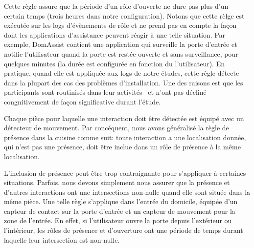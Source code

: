 Cette règle assure que la période d'un rôle d'ouverte ne dure pas plus d'un certain temps (trois heures dans notre configuration). Notons que cette rèlge est exécutée sur les logs d'évènements de rôle et ne prend pas en compte la façon dont les applications d'assistance peuvent réagir à une telle situation. Par exemple, DomAssist contient une application qui surveille la porte d'entrée et notifie l'utilisateur quand la porte est restée ouverte et sans surveillance, pour quelques minutes (la durée est configurée en fonction du l'utilisateur). En pratique, quand elle est appliquée aux logs de notre études, cette règle détecte dans la plupart des cas des problèmes d'installation. Une des raisons est que les participants sont routinisés dans leur activités~\cite{BERGUA-RESTRICTION-IJAHD2013} et n'ont pas décliné congnitivement de façon significative durant l'étude.

Chaque pièce pour laquelle une interaction doit être détectée est équipé avec un détecteur de mouvement. Par concéquent, nous avons généralisé la règle de présence dans la cuisine comme suit: toute interaction a une localisation donnée, qui n'est pas une présence, doit être inclue dans un rôle de présence à la même localisation. 


L'inclusion de présence peut être trop contraignante pour s'appliquer à certaines situations. Parfois, nous devons simplement nous assurer que la présence et d'autres interactions ont une intersections non-nulle quand elle sont située dans la même pièce. Une telle règle s'applique dans l'entrée du domicile, équipée d'un capteur de contact sur la porte d'entrée et un capteur de mouvement pour la zone de l'entrée. En effet, si l'utilisateur ouvre la porte depuis l'extérieur ou l'intérieur, les rôles de présence et d'ouverture ont une période de temps durant laquelle leur intersection est non-nulle.


